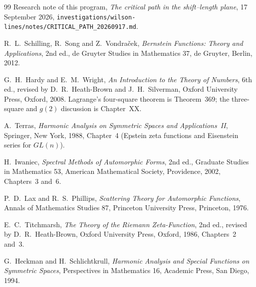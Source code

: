 \begin{thebibliography}{99}
Research note of this program, \emph{The critical path in the shift--length
plane}, 17 September 2026,
\texttt{investigations/wilson-lines/notes/CRITICAL\_PATH\_20260917.md}.

R.~L.~Schilling, R.~Song and Z.~Vondra\v{c}ek, \emph{Bernstein Functions:
Theory and Applications}, 2nd ed., de Gruyter Studies in Mathematics 37,
de Gruyter, Berlin, 2012.

G.~H.~Hardy and E.~M.~Wright, \emph{An Introduction to the Theory of Numbers},
6th ed., revised by D.~R.~Heath-Brown and J.~H.~Silverman, Oxford University
Press, Oxford, 2008. Lagrange's four-square theorem is Theorem~369;
the three-square and $g(2)$ discussion is Chapter~XX.

A.~Terras, \emph{Harmonic Analysis on Symmetric Spaces and Applications~II},
Springer, New York, 1988, Chapter~4 (Epstein zeta functions and Eisenstein
series for $GL(n)$).

H.~Iwaniec, \emph{Spectral Methods of Automorphic Forms}, 2nd ed., Graduate
Studies in Mathematics 53, American Mathematical Society, Providence, 2002,
Chapters~3 and~6.

P.~D.~Lax and R.~S.~Phillips, \emph{Scattering Theory for Automorphic
Functions}, Annals of Mathematics Studies 87, Princeton University Press,
Princeton, 1976.

E.~C.~Titchmarsh, \emph{The Theory of the Riemann Zeta-Function}, 2nd ed.,
revised by D.~R.~Heath-Brown, Oxford University Press, Oxford, 1986,
Chapters~2 and~3.

G.~Heckman and H.~Schlichtkrull, \emph{Harmonic Analysis and Special Functions
on Symmetric Spaces}, Perspectives in Mathematics 16, Academic Press, San
Diego, 1994.
\end{thebibliography}
